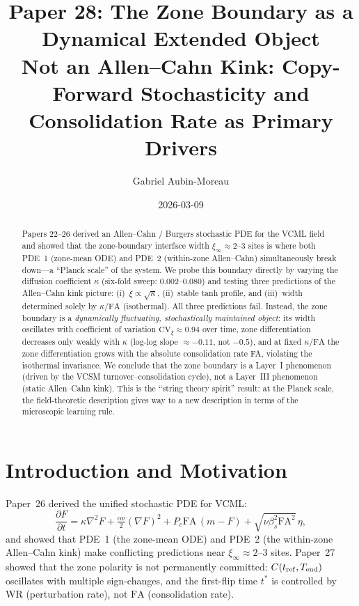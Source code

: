 \documentclass[11pt,a4paper]{article}
\title{\textbf{Paper 28: The Zone Boundary as a Dynamical Extended Object}\\[4pt]
\large Not an Allen--Cahn Kink: Copy-Forward Stochasticity and
       Consolidation Rate as Primary Drivers}
\author{Gabriel Aubin-Moreau}
\date{2026-03-09}
\begin{document}
\maketitle

\begin{abstract}
Papers 22--26 derived an Allen--Cahn / Burgers stochastic PDE for the VCML
field and showed that the zone-boundary interface width $\xi_\infty\approx2$--$3$
sites is where both PDE~1 (zone-mean ODE) and PDE~2 (within-zone
Allen--Cahn) simultaneously break down---a ``Planck scale'' of the system.
We probe this boundary directly by varying the diffusion coefficient $\kappa$
(six-fold sweep: $0.002$--$0.080$) and testing three predictions of the
Allen--Cahn kink picture: (i)~$\xi\propto\sqrt{\kappa}$, (ii)~stable tanh
profile, and (iii)~width determined solely by $\kappa/\mathrm{FA}$ (isothermal).
All three predictions fail.
Instead, the zone boundary is a \emph{dynamically fluctuating, stochastically
maintained object}: its width oscillates with coefficient of variation
$\mathrm{CV}_\xi \approx 0.94$ over time, zone differentiation decreases only
weakly with $\kappa$ (log-log slope $\approx -0.11$, not $-0.5$), and at
fixed $\kappa/\mathrm{FA}$ the zone differentiation grows with the
absolute consolidation rate FA, violating the isothermal invariance.
We conclude that the zone boundary is a Layer~I phenomenon
(driven by the VCSM turnover--consolidation cycle), not a Layer~III
phenomenon (static Allen--Cahn kink).  This is the ``string theory
spirit'' result: at the Planck scale, the field-theoretic description
gives way to a new description in terms of the microscopic learning rule.
\end{abstract}

\section{Introduction and Motivation}

Paper~26 derived the unified stochastic PDE for VCML:
\begin{equation}
  \frac{\partial F}{\partial t}
  = \kappa\nabla^2 F
  + \tfrac{\alpha\nu}{2}(\nabla F)^2
  + P_c \mathrm{FA}\,(m - F)
  + \sqrt{\nu\beta_s^2 \mathrm{FA}^2}\,\eta,
  \label{eq:pde}
\end{equation}
and showed that PDE~1 (the zone-mean ODE) and
PDE~2 (the within-zone Allen--Cahn kink) make conflicting predictions
near $\xi_\infty \approx 2$--$3$ sites.
Paper~27 showed that the zone polarity is not permanently committed:
$C(t_{\rm ref}, T_{\rm end})$ oscillates with multiple sign-changes, and
the first-flip time $t^*$ is controlled by $\mathrm{WR}$ (perturbation
rate), not $\mathrm{FA}$ (consolidation rate).
\end{document}
